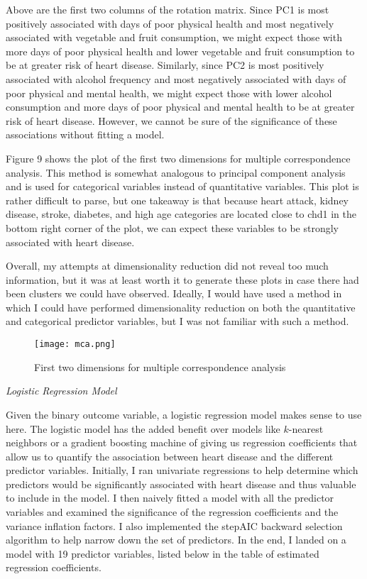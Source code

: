 \documentclass[12pt]{article}
\begin{document}
Above are the first two columns of the rotation matrix. Since PC1 is most positively associated with days of poor physical health and most negatively associated with vegetable and fruit consumption, we might expect those with more days of poor physical health and lower vegetable and fruit consumption to be at greater risk of heart disease. Similarly, since PC2 is most positively associated with alcohol frequency and most negatively associated with days of poor physical and mental health, we might expect those with lower alcohol consumption and more days of poor physical and mental health to be at greater risk of heart disease. However, we cannot be sure of the significance of these associations without fitting a model.

Figure 9 shows the plot of the first two dimensions for multiple correspondence analysis. This method is somewhat analogous to principal component analysis and is used for categorical variables instead of quantitative variables. This plot is rather difficult to parse, but one takeaway is that because heart attack, kidney disease, stroke, diabetes, and high age categories are located close to chd1 in the bottom right corner of the plot, we can expect these variables to be strongly associated with heart disease.

Overall, my attempts at dimensionality reduction did not reveal too much information, but it was at least worth it to generate these plots in case there had been clusters we could have observed. Ideally, I would have used a method in which I could have performed dimensionality reduction on both the quantitative and categorical predictor variables, but I was not familiar with such a method.

\begin{figure}[h!]
\centering
\texttt{[image: mca.png]}
\caption{First two dimensions for multiple correspondence analysis}
\end{figure}

\newpage \noindent \textit{Logistic Regression Model}

\medskip
Given the binary outcome variable, a logistic regression model makes sense to use here. The logistic model has the added benefit over models like $k$-nearest neighbors or a gradient boosting machine of giving us regression coefficients that allow us to quantify the association between heart disease and the different predictor variables. Initially, I ran univariate regressions to help determine which predictors would be significantly associated with heart disease and thus valuable to include in the model. I then naively fitted a model with all the predictor variables and examined the significance of the regression coefficients and the variance inflation factors. I also implemented the stepAIC backward selection algorithm to help narrow down the set of predictors. In the end, I landed on a model with 19 predictor variables, listed below in the table of estimated regression coefficients.
\end{document}
